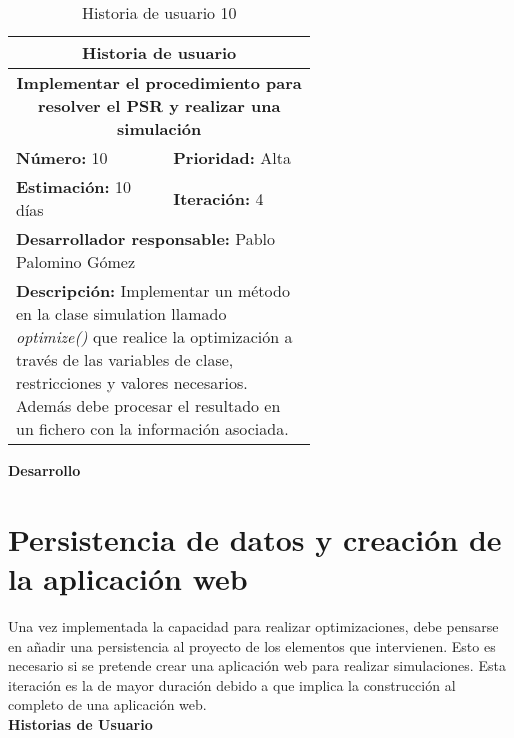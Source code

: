 \begin{table}[H]
        \centering
        \begin{tabular}{|p{0.3\linewidth}|p{0.3\linewidth}|}
          \hline
          \multicolumn{2}{|c|}{Historia de usuario}\\ \hline
          \multicolumn{2}{|c|}{\textbf{Implementar el procedimiento para resolver el PSR y realizar una simulación}}\\ \hline
          \textbf{Número:} 10 & \textbf{Prioridad:} Alta\\ \hline
          \textbf{Estimación:} 10 días & \textbf{Iteración:} 4\\ \hline
          \multicolumn{2}{|l|}{\textbf{Desarrollador responsable:} Pablo Palomino Gómez}\\ \hline
          \multicolumn{2}{|p{0.9\linewidth}|}{\textbf{Descripción:} Implementar un método en la clase simulation llamado \textit{optimize()} que realice la optimización a través de las variables de clase, restricciones y valores necesarios. Además debe procesar el resultado en un fichero con la información asociada.}\\ \hline
        \end{tabular}
        \caption{Historia de usuario 10}
        \label{tab:hist10}
\end{table}
\textbf{Desarrollo}\\


\section{Persistencia de datos y creación de la aplicación web}
\label{sec:hito5}
Una vez implementada la capacidad para realizar optimizaciones, debe pensarse en añadir una persistencia al proyecto de los elementos que intervienen. Esto es necesario si se pretende crear una aplicación web para realizar simulaciones. Esta iteración es la de mayor duración debido a que implica la construcción al completo de una aplicación web.\\

\textbf{Historias de Usuario}\\

